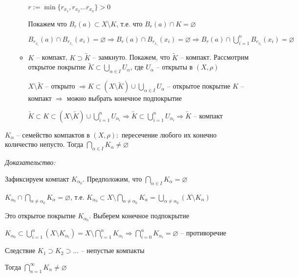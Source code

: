 \documentclass[12pt]{article}
\begin{document}
\begin{enumerate}
\begin{itemize}
        $r := \min\{r_{x_1}, r_{x_2} \ldots r_{x_n}\} > 0$

        Покажем что $B_r(a) \subset X \setminus K$, т.е. что $B_r(a) \cap K = \varnothing$

        $B_{r_{x_i}}(a) \cap B_{r_{x_i}}(x_i) = \varnothing \Rightarrow B_r(a) \cap B_{r_{x_i}}(x_i) = \varnothing \Rightarrow B_r(a) \cap \bigcup\limits_{i = 1}^n B_{r_{x_i}}(x_i) = \varnothing$

        \item $K$ -- компакт, $K \supset \tilde{K}$ -- замкнуто. Покажем, что $\tilde{K}$ -- компакт. Рассмотрим открытое покрытие $\tilde{K} \subset \bigcup\limits_{\alpha \in I} U_\alpha$, где $U_\alpha$ -- открыты в $(X, \rho)$

        $X \setminus \tilde{K}$ -- открыто $\Rightarrow K \subset (X \setminus \tilde{K}) \cup \bigcup\limits_{\alpha \in I} U_\alpha$ -- открытое покрытие $K$ -- компакт $\Rightarrow$ можно выбрать конечное подпокрытие

        $\tilde{K} \subset K \subset (X \setminus \tilde{K}) \cup \bigcup\limits_{i = 1}^n U_{\alpha_i} \Rightarrow \tilde{K} \subset \bigcup\limits_{i = 1}^n U_{\alpha_i} \Rightarrow \tilde{K}$ -- компакт
    \end{itemize}
\end{enumerate}

\begin{theo}{}
    $K_\alpha$ -- семейство компактов в $(X, \rho) :$ пересечение любого их конечно количество непусто. Тогда $\bigcap\limits_{\alpha \in I} K_\alpha \neq \varnothing$
\end{theo}

\textit{Доказательство:}

Зафиксируем компакт $K_{\alpha_0}$. Предположим, что $\bigcap\limits_{\alpha \in I} K_\alpha = \varnothing$

$K_{\alpha_0} \cap \bigcap\limits_{\alpha \neq \alpha_0} K_\alpha = \varnothing$, т.е. $K_{\alpha_0} \subset X \setminus \bigcap\limits_{\alpha \neq \alpha_0} K_\alpha = \bigcup\limits_{\alpha \neq \alpha_0} (X \setminus K_\alpha)$

Это открытое покрытие $K_{\alpha_0}$. Выберем конечное подпокрытие 

$K_{\alpha_0} \subset \bigcup\limits_{i = 1}^n (X \setminus K_{\alpha_i}) = X \setminus \bigcap\limits_{i = 1}^n K_{\alpha_i} \Rightarrow \bigcap\limits_{i = 0}^n K_{\alpha_i} = \varnothing$ -- противоречие

\begin{theo}{Следствие}
    $K_1 \supset K_2 \supset \ldots$ -- непустые компакты

    Тогда $\bigcap\limits_{n = 1}^\infty K_n \neq \varnothing$
\end{theo}
\end{document}
